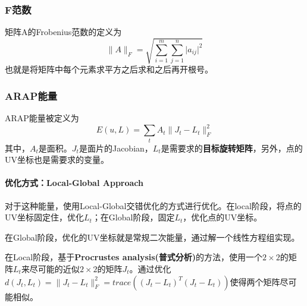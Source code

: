 \documentclass[a4paper]{D:/MyRepo/Script/latex/PaperReadingLog}
\begin{document}
\subsubsection{F范数}
矩阵$\mathrm{A}$的Frobenius范数的定义为
$$
\lVert A \lVert_F=\sqrt{\sum_{i=1}^m\sum_{j=1}^n\lvert a_{ij}\lvert^2}
$$
也就是将矩阵中每个元素求平方之后求和之后再开根号。

\subsubsection{ARAP能量}
ARAP能量被定义为
$$
E(u,L)=\sum_tA_t\lVert J_t-L_t \lVert_F^2
$$
其中，$A_t$是面积。$J_t$是面片的Jacobian，$L_t$是需要求的\textbf{目标旋转矩阵}，另外，点的UV坐标也是需要求的变量。
\paragraph{优化方式：Local-Global Approach}
对于这种能量，使用Local-Global交错优化的方式进行优化。在local阶段，将点的UV坐标固定住，优化$L_t$；在Global阶段，固定$L_t$，优化点的UV坐标。

在Global阶段，优化的UV坐标就是常规二次能量，通过解一个线性方程组实现。

在Local阶段，基于\textbf{Procrustes analysis(普式分析)}的方法，使用一个$2\times 2$的矩阵$L_t$来尽可能的近似$2\times 2$的矩阵$J_t$。通过优化$d(J_t,L_t)=\lVert J_t-L_t \lVert_F^2=trace((J_t-L_t)^T(J_t-L_t))$使得两个矩阵尽可能相似。



\end{document}
